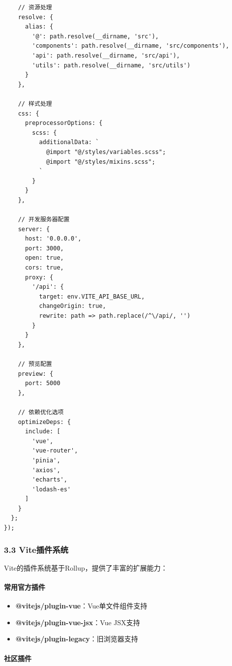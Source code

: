\begin{lstlisting}
    // 资源处理
    resolve: {
      alias: {
        '@': path.resolve(__dirname, 'src'),
        'components': path.resolve(__dirname, 'src/components'),
        'api': path.resolve(__dirname, 'src/api'),
        'utils': path.resolve(__dirname, 'src/utils')
      }
    },
    
    // 样式处理
    css: {
      preprocessorOptions: {
        scss: {
          additionalData: `
            @import "@/styles/variables.scss";
            @import "@/styles/mixins.scss";
          `
        }
      }
    },
    
    // 开发服务器配置
    server: {
      host: '0.0.0.0',
      port: 3000,
      open: true,
      cors: true,
      proxy: {
        '/api': {
          target: env.VITE_API_BASE_URL,
          changeOrigin: true,
          rewrite: path => path.replace(/^\/api/, '')
        }
      }
    },
    
    // 预览配置
    preview: {
      port: 5000
    },
    
    // 依赖优化选项
    optimizeDeps: {
      include: [
        'vue',
        'vue-router',
        'pinia',
        'axios',
        'echarts',
        'lodash-es'
      ]
    }
  };
});
\end{lstlisting}

\subsubsection{3.3 Vite插件系统}\label{viteux63d2ux4ef6ux7cfbux7edf}

Vite的插件系统基于Rollup，提供了丰富的扩展能力：

\paragraph{常用官方插件}\label{ux5e38ux7528ux5b98ux65b9ux63d2ux4ef6-1}

\begin{itemize}
\tightlist
\item
  \textbf{@vitejs/plugin-vue}：Vue单文件组件支持
\item
  \textbf{@vitejs/plugin-vue-jsx}：Vue JSX支持
\item
  \textbf{@vitejs/plugin-legacy}：旧浏览器支持
\end{itemize}

\paragraph{社区插件}\label{ux793eux533aux63d2ux4ef6}

